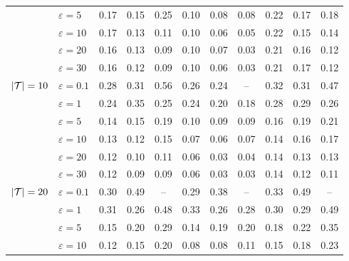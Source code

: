 \begin{table*}[htbp]
{\begin{tabular}{llccccccccc}
                                & $\varepsilon = 5$   & 0.17    & 0.15   & 0.25   & 0.10    & 0.08    & 0.08   & 0.22       & 0.17       & 0.18      \\
                                & $\varepsilon = 10$  & 0.17    & 0.13   & 0.11   & 0.10    & 0.06    & 0.05   & 0.22       & 0.15       & 0.14      \\
                                & $\varepsilon = 20$  & 0.16    & 0.13   & 0.09   & 0.10    & 0.07    & 0.03   & 0.21       & 0.16       & 0.12      \\
                                & $\varepsilon = 30$  & 0.16    & 0.12   & 0.09   & 0.10    & 0.06    & 0.03   & 0.21       & 0.17       & 0.12      \\
\midrule
\multirow{6}{*}{$\lvert \mathcal{T} \rvert = 10$} & $\varepsilon = 0.1$ & 0.28    & 0.31   & 0.56   & 0.26    & 0.24    & --   & 0.32       & 0.31       & 0.47      \\
                                & $\varepsilon = 1$   & 0.24    & 0.35   & 0.25   & 0.24    & 0.20    & 0.18   & 0.28       & 0.29       & 0.26      \\
                                & $\varepsilon = 5$   & 0.14    & 0.15   & 0.19   & 0.10    & 0.09    & 0.09   & 0.16       & 0.19       & 0.21      \\
                                & $\varepsilon = 10$  & 0.13    & 0.12   & 0.15   & 0.07    & 0.06    & 0.07   & 0.14       & 0.16       & 0.17      \\
                                & $\varepsilon = 20$  & 0.12    & 0.10   & 0.11   & 0.06    & 0.03    & 0.04   & 0.14       & 0.13       & 0.13      \\
                                & $\varepsilon = 30$  & 0.12    & 0.09   & 0.09   & 0.06    & 0.03    & 0.03   & 0.14       & 0.12       & 0.11      \\
\midrule
\multirow{6}{*}{$\lvert \mathcal{T} \rvert = 20$} & $\varepsilon = 0.1$ & 0.30    & 0.49   & --   & 0.29    & 0.38    & --   & 0.33       & 0.49       & --      \\
                                & $\varepsilon = 1$   & 0.31    & 0.26   & 0.48   & 0.33    & 0.26    & 0.28   & 0.30       & 0.29       & 0.49      \\
                                & $\varepsilon = 5$   & 0.15    & 0.20   & 0.29   & 0.14    & 0.19    & 0.20   & 0.18       & 0.22       & 0.35      \\
                                & $\varepsilon = 10$  & 0.12    & 0.15   & 0.20   & 0.08    & 0.08    & 0.11   & 0.15       & 0.18       & 0.23      \\

\end{tabular}}
\end{table*}
